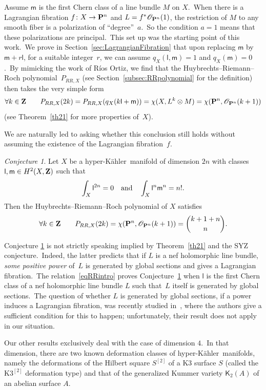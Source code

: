 \documentclass[12pt]{amsart}
\def\cO{\mathscr{O}}
\def\Z{{\bf Z}}
\def\P{{\bf P}}
\def\ot{\otimes}
\def\hk{hyper-K\"ahler}
\theoremstyle{remark}
\newtheorem{conj}[lemm]{Conjecture}
\def\lll{\ensuremath{\mathsf l}}
\def\mm{\ensuremath{\mathsf m}}
\def\K{\ensuremath{\mathsf K}}
\begin{document}
Assume  $\mm$ is the first Chern class of  a line bundle $M$ on $X$.\
When there is a Lagrangian fibration $f\colon X\to \P^n$ and $L=f^*\cO_{\P^n}(1)$, the restriction of $M$ to any smooth fiber is  a polarization of ``degree''~$a$.\
So the condition $a=1$ means that these  polarizations are  principal.\
This set up was the starting point of this work.\
We prove in Section~\ref{sec:LagrangianFibration}  that upon replacing $\mm$ by $\mm+r\lll$, for a suitable integer~$r$,  we can assume $q_X(\lll,\mm)=1$ and $q_X(\mm)=0$.\
By mimicking the work \cite{ort} of R\'ios Ortiz, we find that the  Huybrechts--Riemann--Roch polynomial~$P_{RR,X}$ (see  Section~\ref{subsec:RRpolynomial} for the definition) then takes the very simple form
\begin{equation}\label{eqRRintro}
\forall k\in\Z\qquad P_{RR,X}(2k)=P_{RR,X}(q_X(k\lll+\mm))=\chi(X,L^k\ot M)=\chi(\P^n,\cO_{\P^n}(k+1))
\end{equation}
(see Theorem~\ref{th21} for more properties of~$X$).

We are naturally led to asking whether this conclusion still holds without assuming the existence of the Lagrangian fibration~$f$.

\begin{conj}\label{conjnum}
Let $X$ be a \hk\ manifold of dimension $2n$ with  classes $\lll,\mm\in H^2(X,\Z)$ such that
\[
\int_X\lll^{2n}=0\quad\textnormal{and}\quad\int_X\lll^n\mm^n=n!.
\]
Then the Huybrechts--Riemann--Roch polynomial of $X$  satisfies
$$\forall k\in\Z\qquad P_{RR,X}(2k)=\chi(\P^n,\cO_{\P^n}(k+1))=\binom{k+1+n}{n}.$$
\end{conj}

Conjecture \ref{conjnum} is not strictly speaking implied by Theorem~\ref{th21} and the SYZ conjecture.\ Indeed, the latter predicts that if $L$ is a nef holomorphic line bundle, {\it some positive power} of~$L$ is generated by global sections and gives a Lagrangian fibration.\
The relation~\eqref{eqRRintro} proves Conjecture~\ref{conjnum}  when $\lll$ is the first Chern class of a nef holomorphic line bundle $L$ such that~$L$ itself is generated by global sections.\
The question of whether $L$ is generated by global sections, if a power induces a Lagrangian fibration, was recently studied  in~\cite{kv}, where the authors give  a sufficient condition for this to happen; unfortunately, their result does not apply in our situation.

Our other results exclusively deal with the case of dimension $4$.\
In that dimension, there are two known deformation classes of \hk\ manifolds, namely the deformations of the Hilbert square $S^{[2]}$ of  a K3 surface $S$ (called the $\mathrm{K3}^{[2]}$ deformation type) and that of the generalized Kummer variety $\K_2(A)$ of an abelian surface $A$.\
\end{document}
